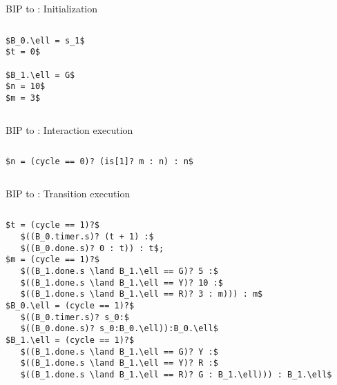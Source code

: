 \begin{frame}[containsverbatim]{BIP to \thislanguage: Initialization}
\begin{columns}
 \begin{lstlisting}
$B_0.\ell = s_1$
$t = 0$

$B_1.\ell = G$
$n = 10$
$m = 3$
 \end{lstlisting}
    \resizebox{0.9\textwidth}{!}{
  
}
\end{columns}
\end{frame}

\begin{frame}[containsverbatim]{BIP to \thislanguage: Interaction execution}
\begin{columns}
 \begin{lstlisting}
$n = (cycle == 0)? (is[1]? m : n) : n$
 \end{lstlisting}
    \resizebox{0.9\textwidth}{!}{
  
}
\end{columns}
\end{frame}

\begin{frame}[containsverbatim]{BIP to \thislanguage: Transition execution}
\begin{columns}
 \begin{lstlisting}
$t = (cycle == 1)?$ 
   $((B_0.timer.s)? (t + 1) :$
   $((B_0.done.s)? 0 : t)) : t$;
$m = (cycle == 1)?$
   $((B_1.done.s \land B_1.\ell == G)? 5 :$
   $((B_1.done.s \land B_1.\ell == Y)? 10 :$
   $((B_1.done.s \land B_1.\ell == R)? 3 : m))) : m$
$B_0.\ell = (cycle == 1)?$
   $((B_0.timer.s)? s_0:$
   $((B_0.done.s)? s_0:B_0.\ell)):B_0.\ell$
$B_1.\ell = (cycle == 1)?$
   $((B_1.done.s \land B_1.\ell == G)? Y :$
   $((B_1.done.s \land B_1.\ell == Y)? R :$
   $((B_1.done.s \land B_1.\ell == R)? G : B_1.\ell))) : B_1.\ell$
 \end{lstlisting}
    \resizebox{0.9\textwidth}{!}{
  
}
\end{columns}
\end{frame}

